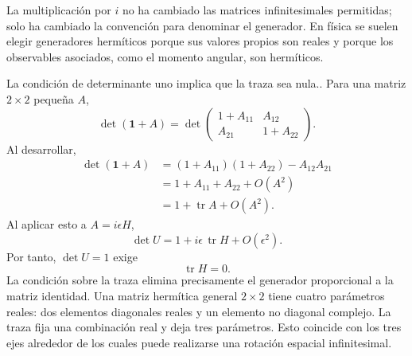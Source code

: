 La multiplicación por \(i\) no ha cambiado las matrices infinitesimales permitidas; solo ha cambiado la convención para denominar el generador. En física se suelen elegir generadores hermíticos porque sus valores propios son reales y porque los observables asociados, como el momento angular, son hermíticos.

La condición de determinante uno implica que la traza sea nula.. Para una matriz \(2\times2\) pequeña \(A\),
\begin{equation}
\det(\boldsymbol 1+A)
=
\det
\begin{pmatrix}
1+A_{11}&A_{12}\\
A_{21}&1+A_{22}
\end{pmatrix}.
\end{equation}
Al desarrollar,
\begin{align}
\det(\boldsymbol 1+A)
 &=(1+A_{11})(1+A_{22})-A_{12}A_{21}\\
 &=1+A_{11}+A_{22}+O(A^2)\\
 &=1+\operatorname{tr}A+O(A^2).
\end{align}
Al aplicar esto a \(A=i\epsilon H\),
\begin{equation}
\det U=1+i\epsilon\,\operatorname{tr}H+O(\epsilon^2).
\end{equation}
Por tanto, \(\det U=1\) exige
\begin{equation}
\operatorname{tr}H=0.
\end{equation}
La condición sobre la traza elimina precisamente el generador proporcional a la matriz identidad. Una matriz hermítica general \(2\times2\) tiene cuatro parámetros reales: dos elementos diagonales reales y un elemento no diagonal complejo. La traza fija una combinación real y deja tres parámetros. Esto coincide con los tres ejes alrededor de los cuales puede realizarse una rotación espacial infinitesimal.

